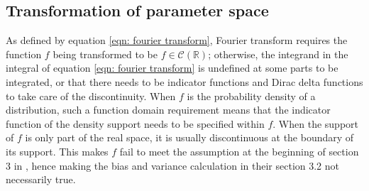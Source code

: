 \documentclass[%
 reprint,
 amsmath,amssymb,
 aps,
]{revtex4-2}
\def\R{\mathbb{R}}
\begin{document}
\subsection{\label{subsec:transformation of parameter space} Transformation of parameter space}
As defined by equation \eqref{eqn: fourier transform}, Fourier transform requires the function $f$ being transformed to be $f \in \mathcal{C}(\R)$; otherwise, the integrand in the integral of equation \eqref{eqn: fourier transform} is undefined at some parts to be integrated, or that there needs to be indicator functions and Dirac delta functions to take care of the discontinuity. When $f$ is the probability density of a distribution, such a function domain requirement means that the indicator function of the density support needs to be specified within $f$. When the support of $f$ is only part of the real space, it is usually discontinuous at the boundary of its support. This makes $f$ fail to meet the assumption at the beginning of section 3 in \cite{rotiroti2022computing}, hence making the bias and variance calculation in their section 3.2 not necessarily true.
\end{document}
